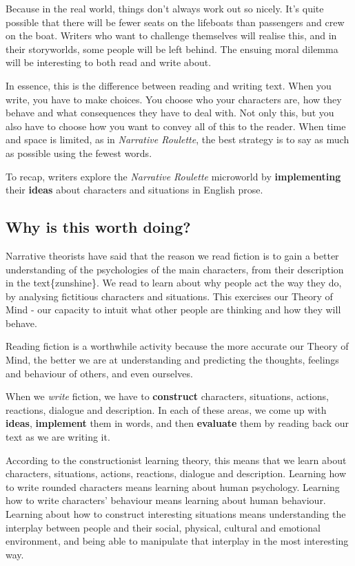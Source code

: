 Because in the real world, things don't always work out so nicely. It's
quite possible that there will be fewer seats on the lifeboats than
passengers and crew on the boat. Writers who want to challenge
themselves will realise this, and in their storyworlds, some people will
be left behind. The ensuing moral dilemma will be interesting to both
read and write about.

In essence, this is the difference between reading and writing text.
When you write, you have to make choices. You choose who your characters
are, how they behave and what consequences they have to deal with. Not
only this, but you also have to choose how you want to convey all of
this to the reader. When time and space is limited, as in
\emph{Narrative Roulette}, the best strategy is to say as much as
possible using the fewest words.

To recap, writers explore the \emph{Narrative Roulette} microworld by
\textbf{implementing} their \textbf{ideas} about characters and
situations in English prose.

\subsection{Why is this worth doing?}

Narrative theorists have said that the reason we read fiction is to gain
a better understanding of the psychologies of the main characters, from
their description in the text\{zunshine\}. We read to learn about why
people act the way they do, by analysing fictitious characters and
situations. This exercises our Theory of Mind - our capacity to intuit
what other people are thinking and how they will behave.

Reading fiction is a worthwhile activity because the more accurate our
Theory of Mind, the better we are at understanding and predicting the
thoughts, feelings and behaviour of others, and even ourselves.

When we \emph{write} fiction, we have to \textbf{construct} characters,
situations, actions, reactions, dialogue and description. In each of
these areas, we come up with \textbf{ideas}, \textbf{implement} them in
words, and then \textbf{evaluate} them by reading back our text as we
are writing it.

According to the constructionist learning theory, this means that we
learn about characters, situations, actions, reactions, dialogue and
description. Learning how to write rounded characters means learning
about human psychology. Learning how to write characters' behaviour
means learning about human behaviour. Learning about how to construct
interesting situations means understanding the interplay between people
and their social, physical, cultural and emotional environment, and
being able to manipulate that interplay in the most interesting way.

